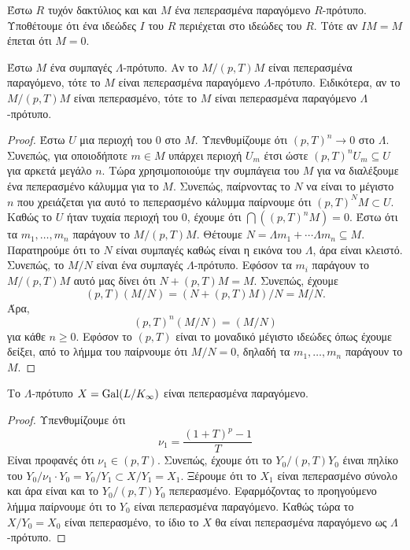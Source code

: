 \begin{lemma}
    \label{nakayama}
    Έστω $R$ τυχόν δακτύλιος και και $M$ ένα πεπερασμένα παραγόμενο $R$-πρότυπο. Υποθέτουμε ότι ένα ιδεώδες $I$ του $R$ περιέχεται στο ιδεώδες  του $R$. Τότε αν $IM = M$ έπεται ότι $M=0$.
\end{lemma}


\begin{lemma} Έστω $M$ ένα συμπαγές $\Lambda$-πρότυπο. Αν το $M/(p,T)M$ είναι πεπερασμένα παραγόμενο, τότε το $M$ είναι πεπερασμένα παραγόμενο $\Lambda$-πρότυπο. Ειδικότερα, αν το $M/(p,T)M$ είναι πεπερασμένο, τότε το $M$ είναι πεπερασμένα παραγόμενο $\Lambda$-πρότυπο.
\end{lemma}

\begin{proof} Έστω $U$ μια περιοχή του $0$ στο $M$. Υπενθυμίζουμε ότι $(p,T)^n \rightarrow 0$ στο $\Lambda$. Συνεπώς, για οποιοδήποτε $m \in M$ υπάρχει περιοχή $U_m$ έτσι ώστε $(p,T)^n U_m \subseteq U$ για αρκετά μεγάλο $n$. Τώρα χρησιμοποιούμε την συμπάγεια του $M$ για να διαλέξουμε ένα πεπερασμένο κάλυμμα για το $M$. Συνεπώς, παίρνοντας το $N$ να είναι το μέγιστο $n$ που χρειάζεται για αυτό το πεπερασμένο κάλυμμα παίρνουμε ότι $(p,T)^N M \subset U$. Καθώς το $U$ ήταν τυχαία περιοχή του $0$, έχουμε ότι $\bigcap \left( (p,T)^n M\right) = 0$. Έστω ότι τα $m_1,\ldots, m_n$ παράγουν το $M/(p,T)M$. Θέτουμε $N = \Lambda m_1 + \cdots \Lambda m_n \subseteq M$. Παρατηρούμε ότι το $N$ είναι συμπαγές καθώς είναι η εικόνα του $\Lambda$, άρα είναι κλειστό. Συνεπώς, το $M/N$ είναι ένα συμπαγές $\Lambda$-πρότυπο. Εφόσον τα $m_i$ παράγουν το $M/(p,T)M$ αυτό μας δίνει ότι $N+(p,T)M = M$. Συνεπώς, έχουμε
    $$(p,T)(M/N) = (N+(p,T)M)/N = M/N.$$ Άρα,
    $$(p,T)^n (M/N) = (M/N)$$ για κάθε $n\geq 0$. Εφόσον το $(p,T)$ είναι το μοναδικό μέγιστο ιδεώδες όπως έχουμε δείξει, από το λήμμα του  παίρνουμε ότι $M/N = 0$, δηλαδή τα $m_1,\ldots,m_n$ παράγουν το $M$.
\end{proof}

\begin{cor}\label{cor4.24}
    Το $\Lambda$-πρότυπο $X= \operatorname{Gal}(L/K_\infty)$ είναι πεπερασμένα παραγόμενο.
\end{cor}

\begin{proof} Υπενθυμίζουμε ότι
    $$\nu_1 = \frac{(1+T)^p -1}{T}$$
    Είναι προφανές ότι $\nu_1 \in (p,T)$. Συνεπώς, έχουμε ότι το $Y_0/(p,T)Y_0$ έιναι πηλίκο του $Y_0/\nu_1 \cdot Y_0 = Y_0/Y_1 \subset X/Y_1 = X_1$. Ξέρουμε ότι το $X_1$ είναι πεπερασμένο σύνολο και άρα είναι και το $Y_0/(p,T)Y_0$ πεπερασμένο. Εφαρμόζοντας το προηγούμενο λήμμα παίρνουμε ότι το $Y_0$ είναι πεπερασμένα παραγόμενο. Καθώς τώρα το $X/Y_0 = X_0$ είναι πεπερασμένο, το ίδιο το $X$ θα είναι πεπερασμένα παραγόμενο ως $\Lambda$-πρότυπο.
\end{proof}

